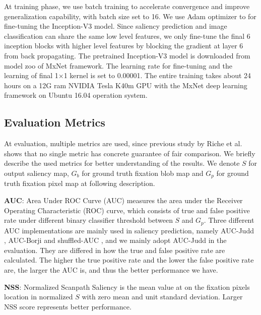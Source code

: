 \documentclass[letterpaper, 10 pt, conference]{ieeeconf}  %
\begin{document}
\par At training phase, we use batch training to accelerate convergence and improve generalization capability, with batch size set to 16. We use Adam \cite{b30} optimizer to for fine-tuning the Inception-V3 model. Since saliency prediction and image classification can share the same low level features, we only fine-tune the final 6 inception blocks with higher level features by blocking the gradient at layer 6 from back propagating. The pretrained Inception-V3 model is downloaded from model zoo of MxNet framework. The learning rate for fine-tuning and the learning of final 1$\times$1 kernel is set to 0.00001. The entire training takes about 24 hours on a 12G ram NVIDIA Tesla K40m GPU with the MxNet deep learning framework \cite{b31} on Ubuntu 16.04 operation system.

\subsection{Evaluation Metrics}

\par At evaluation, multiple metrics are used, since previous study by Riche et al. \cite{b32} shows that no single metric has concrete guarantee of fair comparison. We briefly describe the used metrics for better understanding of the results. We denote $S$ for output saliency map, $G_{b}$ for ground truth fixation blob map and $G_{p}$ for ground truth fixation pixel map at following description.

\par \textbf{AUC}: Area Under ROC Curve (AUC) measures the area under the Receiver Operating Characteristic (ROC) curve, which consists of true and false positive rate under different binary classifier threshold between $S$ and $G_{p}$. Three different AUC implementations are mainly used in saliency prediction, namely AUC-Judd \cite{b32}, AUC-Borji \cite{b33} and shuffled-AUC \cite{b34}, and we mainly adopt AUC-Judd in the evaluation. They are differed in how the true and false positive rate are calculated. The higher the true positive rate and the lower the false positive rate are, the larger the AUC is, and thus the better performance we have.

\par \textbf{NSS}: Normalized Scanpath Saliency \cite{35} is the mean value at on the fixation pixels location in normalized $S$ with zero mean and unit standard deviation. Larger NSS score represents better performance.
\end{document}
